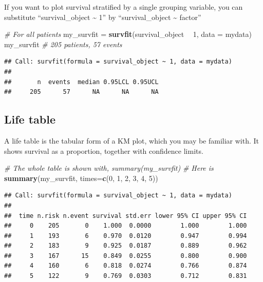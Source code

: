\documentclass[]{book}
\makeatletter
\newenvironment{Shaded}{\begin{snugshade}}{\end{snugshade}}
\newcommand{\KeywordTok}[1]{\textcolor[rgb]{0.13,0.29,0.53}{\textbf{#1}}}
\newcommand{\DataTypeTok}[1]{\textcolor[rgb]{0.13,0.29,0.53}{#1}}
\newcommand{\DecValTok}[1]{\textcolor[rgb]{0.00,0.00,0.81}{#1}}
\newcommand{\StringTok}[1]{\textcolor[rgb]{0.31,0.60,0.02}{#1}}
\newcommand{\CommentTok}[1]{\textcolor[rgb]{0.56,0.35,0.01}{\textit{#1}}}
\newcommand{\OperatorTok}[1]{\textcolor[rgb]{0.81,0.36,0.00}{\textbf{#1}}}
\newcommand{\NormalTok}[1]{#1}
\newenvironment{kframe}{%
\medskip{}
\setlength{\fboxsep}{.8em}
 \def\at@end@of@kframe{}%
 \ifinner\ifhmode%
  \def\at@end@of@kframe{\end{minipage}}%
  \begin{minipage}{\columnwidth}%
 \fi\fi%
 \def\FrameCommand##1{\hskip\@totalleftmargin \hskip-\fboxsep
 \colorbox{shadecolor}{##1}\hskip-\fboxsep
     \hskip-\linewidth \hskip-\@totalleftmargin \hskip\columnwidth}%
 \MakeFramed {\advance\hsize-\width
   \@totalleftmargin\z@ \linewidth\hsize
   \@setminipage}}%
 {\par\unskip\endMakeFramed%
 \at@end@of@kframe}
\renewenvironment{Shaded}{\begin{kframe}}{\end{kframe}}
\makeatother
\begin{document}
If you want to plot survival stratified by a single grouping variable,
you can substitute ``survival\_object \textasciitilde{} 1'' by
``survival\_object \textasciitilde{} factor''

\begin{Shaded}
\begin{Highlighting}[]
\CommentTok{# For all patients}
\NormalTok{my_survfit =}\StringTok{ }\KeywordTok{survfit}\NormalTok{(survival_object }\OperatorTok{~}\StringTok{ }\DecValTok{1}\NormalTok{, }\DataTypeTok{data =}\NormalTok{ mydata)}
\NormalTok{my_survfit }\CommentTok{# 205 patients, 57 events}
\end{Highlighting}
\end{Shaded}

\begin{verbatim}
## Call: survfit(formula = survival_object ~ 1, data = mydata)
## 
##       n  events  median 0.95LCL 0.95UCL 
##     205      57      NA      NA      NA
\end{verbatim}

\subsection{Life table}\label{life-table}

A life table is the tabular form of a KM plot, which you may be familiar
with. It shows survival as a proportion, together with confidence
limits.

\begin{Shaded}
\begin{Highlighting}[]
\CommentTok{# The whole table is shown with, summary(my_survfit)}
\CommentTok{# Here is }
\KeywordTok{summary}\NormalTok{(my_survfit, }\DataTypeTok{times=}\KeywordTok{c}\NormalTok{(}\DecValTok{0}\NormalTok{, }\DecValTok{1}\NormalTok{, }\DecValTok{2}\NormalTok{, }\DecValTok{3}\NormalTok{, }\DecValTok{4}\NormalTok{, }\DecValTok{5}\NormalTok{))}
\end{Highlighting}
\end{Shaded}

\begin{verbatim}
## Call: survfit(formula = survival_object ~ 1, data = mydata)
## 
##  time n.risk n.event survival std.err lower 95% CI upper 95% CI
##     0    205       0    1.000  0.0000        1.000        1.000
##     1    193       6    0.970  0.0120        0.947        0.994
##     2    183       9    0.925  0.0187        0.889        0.962
##     3    167      15    0.849  0.0255        0.800        0.900
##     4    160       6    0.818  0.0274        0.766        0.874
##     5    122       9    0.769  0.0303        0.712        0.831
\end{verbatim}
\end{document}
